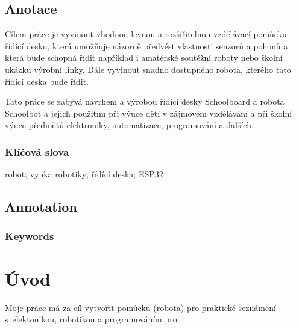 \documentclass{template/socthesis}
\author{Tomáš Vavrinec}
\begin{document}
\maketitle



\pagestyle{empty}

\section*{Anotace}

Cílem práce je  vyvinout vhodnou levnou a rozšiřitelnou vzdělávací pomůcku -- řídící desku, která umožňuje názorně předvést vlastnosti senzorů a pohonů a která bude schopná řídit například i amatérské soutěžní roboty nebo školní ukázku výrobní linky. Dále vyvinout snadno dostupného robota, kterého tato řídící deska bude řídit.

Tato práce se zabývá návrhem a výrobou řídící desky Schoolboard a robota Schoolbot a jejich použitím při výuce dětí v zájmovém vzdělávání a při školní výuce předmětů elektroniky, automatizace, programování a dalších. 

\subsection*{Klíčová slova}
robot; vyuka robotiky; řídící deska; ESP32

\vspace{20mm}

\section*{Annotation}

\subsection*{Keywords}

\newpage
\pagestyle{plain}

\tableofcontents %

\setcounter{figure}{0}
\setcounter{table}{0}
\newpage

\chapter*{Úvod}
Moje práce má za cíl vytvořit pomůcku (robota) pro praktické seznámení s~elektonikou, robotikou a programováním pro:  
\end{document}
